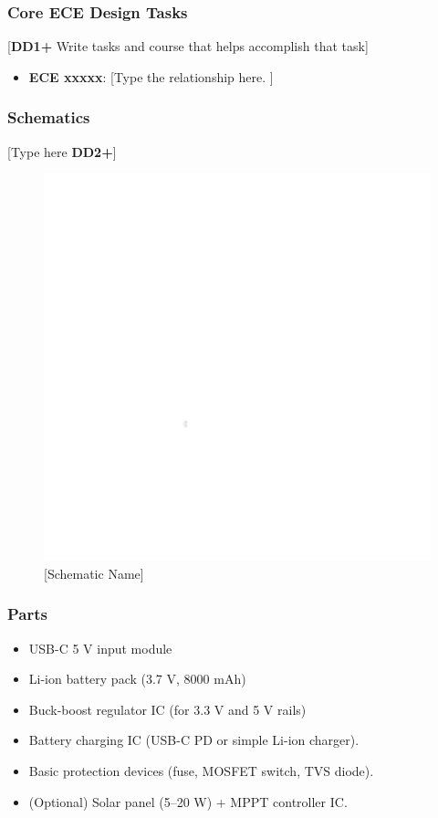 \subsubsection{Core ECE Design Tasks}
[\textbf{DD1+} Write tasks and course that helps accomplish that task]
\begin{itemize}
    \item \textbf{ECE xxxxx}: [Type the relationship here. ]
\end{itemize}

\subsubsection{Schematics}
[Type here \textbf{DD2+}]
\begin{figure}[h]
    \centering
    \includegraphics[width=16cm]{images/white.png} %
    \caption{[Schematic Name]}
\end{figure} %

\subsubsection{Parts}
\begin{itemize}
    \item USB-C 5 V input module
    \item Li-ion battery pack (3.7 V, 8000 mAh)
    \item Buck-boost regulator IC (for 3.3 V and 5 V rails)
    \item Battery charging IC (USB-C PD or simple Li-ion charger).
    \item Basic protection devices (fuse, MOSFET switch, TVS diode).
    \item (Optional) Solar panel (5–20 W) + MPPT controller IC.
\end{itemize}

